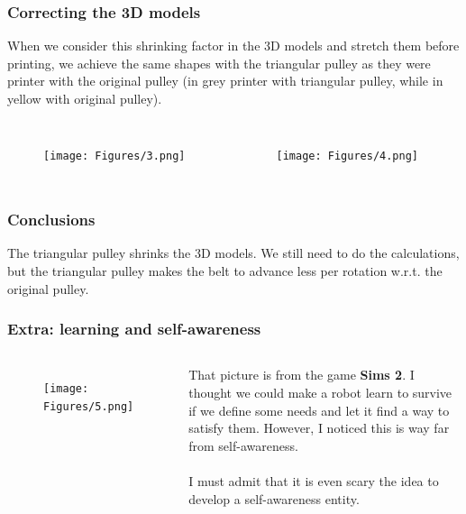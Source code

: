 \documentclass[aspectratio=169]{beamer}\usepackage[utf8]{inputenc}
\begin{document}
\begin{frame}\frametitle{Correcting the 3D models}

When we consider this shrinking factor in the 3D models and stretch them before printing, we achieve the same shapes with the triangular pulley as they were printer with the original pulley (in grey printer with triangular pulley, while in yellow with original pulley).

\begin{columns}[c]

\begin{figure}[ht!]
\centering
\texttt{[image: Figures/3.png]}
\end{figure}

\begin{figure}[ht!]
\centering
\texttt{[image: Figures/4.png]}
\end{figure}

\end{columns}

\end{frame}



\begin{frame}\frametitle{Conclusions}

The triangular pulley shrinks the 3D models. We still need to do the calculations, but the triangular pulley makes the belt to advance less per rotation w.r.t. the original pulley.

\end{frame}



\begin{frame}\frametitle{Extra: learning and self-awareness}

\begin{columns}[c]

\begin{figure}[ht!]
\centering
\texttt{[image: Figures/5.png]}
\end{figure}

That picture is from the game \textbf{Sims 2}. I thought we could make a robot learn to survive if we define some needs and let it find a way to satisfy them. However, I noticed this is way far from self-awareness.\\
\quad\\
I must admit that it is even scary the idea to develop a self-awareness entity.

\end{columns}

\end{frame}
\end{document}
